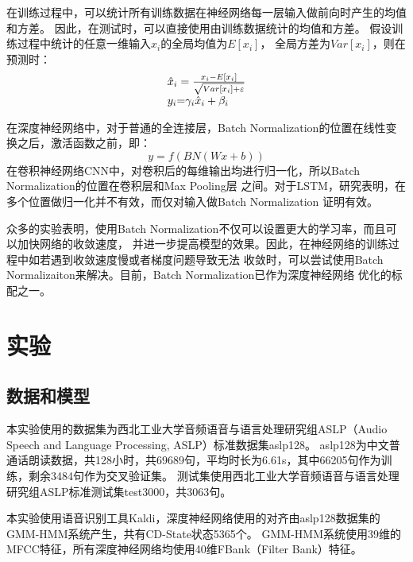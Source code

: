 在训练过程中，可以统计所有训练数据在神经网络每一层输入做前向时产生的均值和方差。
因此，在测试时，可以直接使用由训练数据统计的均值和方差。
假设训练过程中统计的任意一维输入$x_i$的全局均值为$E\left[ {{x_i}} \right]$，
全局方差为$Var[{x_i}]$，则在预测时：
\begin{equation}
\begin{array}{l}
{{\hat x}_i} = \frac{{{x_i} - E\left[ {{x_i}} \right]}}{{\sqrt {Var[{x_i}] + \varepsilon } }}\\
{y_i}{\rm{ = }}{\gamma _i}{{\hat x}_i} + {\beta _i}
\end{array}
\end{equation}

在深度神经网络中，对于普通的全连接层，Batch Normalization的位置在线性变换之后，激活函数之前，即：
\begin{equation}
y = f(BN(Wx + b))
\end{equation}
在卷积神经网络CNN中，对卷积后的每维输出均进行归一化，所以Batch Normalization的位置在卷积层和Max Pooling层
之间。对于LSTM，研究表明，在多个位置做归一化并不有效，而仅对输入做Batch Normalization
证明有效。

众多的实验表明，使用Batch Normalization不仅可以设置更大的学习率，而且可以加快网络的收敛速度，
并进一步提高模型的效果。因此，在神经网络的训练过程中如若遇到收敛速度慢或者梯度问题导致无法
收敛时，可以尝试使用Batch Normalizaiton来解决。目前，Batch Normalization已作为深度神经网络
优化的标配之一。

\section{实验}

\subsection{数据和模型}

本实验使用的数据集为西北工业大学音频语音与语言处理研究组ASLP（Audio Speech and Language Processing, ASLP）标准数据集aslp128。
aslp128为中文普通话朗读数据，共128小时，共69689句，平均时长为6.61s，其中66205句作为训练，剩余3484句作为交叉验证集。
测试集使用西北工业大学音频语音与语言处理研究组ASLP标准测试集test3000，共3063句。

本实验使用语音识别工具Kaldi，深度神经网络使用的对齐由aslp128数据集的GMM-HMM系统产生，共有CD-State状态5365个。
GMM-HMM系统使用39维的MFCC特征，所有深度神经网络均使用40维FBank（Filter Bank）特征。

